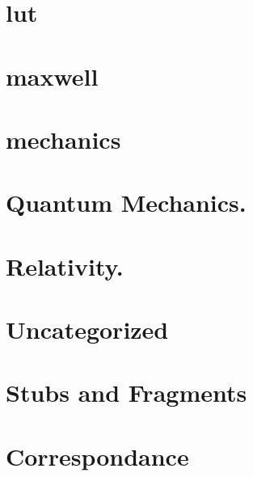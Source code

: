 \documentclass[12pt,leqno]{book}
\begin{document}
\part{lut}



\part{maxwell}



\part{mechanics}





\part{Quantum Mechanics.}

















\part{Relativity.}







\part{Uncategorized}









\part{Stubs and Fragments}



\part{Correspondance}











\end{document}
